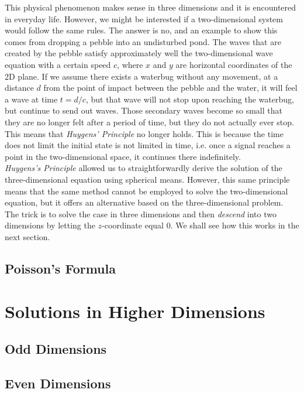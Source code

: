 \documentclass[a4paper, 12pt]{article}
\numberwithin{equation}{section}
\begin{document}
This physical phenomenon makes sense in three dimensions and it is encountered in everyday life. However, we might be interested if a two-dimensional system would follow
the same rules. The answer is no, and an example to show this comes from dropping a pebble into an undisturbed pond. The waves that are created by the pebble satisfy 
approximately well the two-dimensional wave equation with a certain speed $c$, where $x$ and $y$ are horizontal coordinates of the 2D plane. If we assume there exists
a waterbug without any movement, at a distance $d$ from the point of impact between the pebble and the water, it will feel a wave at time $t=d/c$, but that wave will
not stop upon reaching the waterbug, but continue to send out waves. Those secondary waves become so small that they are no longer felt after a period of time, but they 
do not actually ever stop. \cite{Str} This means that \emph{Huygens' Principle} no longer holds. This is because the time does not limit the initial state is not limited 
in time, i.e. once a signal reaches a point in the two-dimensional space, it continues there indefinitely. \cite{Hil}
\\

\emph{Huygens's Principle} allowed us to straightforwardly derive the solution of the three-dimensional equation using spherical means. However, this same principle
means that the same method cannot be employed to solve the two-dimensional equation, but it offers an alternative based on the three-dimensional problem. The trick is
to solve the case in three dimensions and then \emph{descend} into two dimensions by letting the $z$-coordinate equal $0$. \cite{Ev} We shall see how this works in the 
next section. 

\subsection{Poisson's Formula}

\section{Solutions in Higher Dimensions}

\subsection{Odd Dimensions}
\subsection{Even Dimensions}
\end{document}
